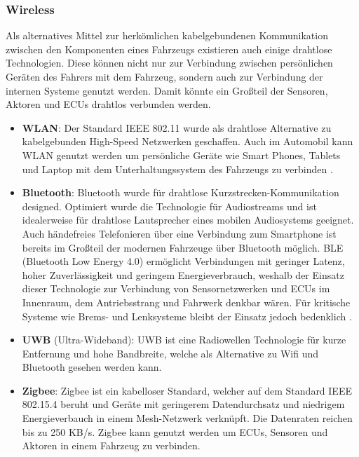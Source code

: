         \subsubsection{Wireless}
        Als alternatives Mittel zur herkömlichen kabelgebundenen Kommunikation zwischen den Komponenten eines Fahrzeugs existieren auch einige drahtlose Technologien.
        Diese können nicht nur zur Verbindung zwischen persönlichen Geräten des Fahrers mit dem Fahrzeug, sondern auch zur Verbindung der internen Systeme genutzt werden.
        Damit könnte ein Großteil der Sensoren, Aktoren und ECUs drahtlos verbunden werden.
            \begin{itemize}
                \item \textbf{WLAN}: Der Standard IEEE 802.11 wurde als drahtlose Alternative zu kabelgebunden High-Speed
                Netzwerken geschaffen. Auch im Automobil kann WLAN genutzt werden um persönliche Geräte wie Smart Phones,
                Tablets und Laptop mit dem Unterhaltungssystem des Fahrzeugs zu verbinden \cite{TW_huang2018vehicle}. 
                \item \textbf{Bluetooth}: Bluetooth wurde für drahtlose Kurzstrecken-Kommunikation designed. Optimiert wurde die
                Technologie für Audiostreams und ist idealerweise für drahtlose Lautsprecher eines mobilen Audiosystems geeignet.
                Auch händefreies Telefonieren über eine Verbindung zum Smartphone ist bereits im Großteil der modernen Fahrzeuge 
                über Bluetooth möglich. BLE (Bluetooth Low Energy 4.0) ermöglicht Verbindungen mit geringer Latenz, hoher Zuverlässigkeit
                und geringem Energieverbrauch, weshalb der Einsatz dieser Technologie zur Verbindung von Sensornetzwerken und ECUs im Innenraum, 
                dem Antriebsstrang und Fahrwerk denkbar wären. Für kritische Systeme wie Brems- und Lenksysteme bleibt der Einsatz jedoch bedenklich \cite{TW_huang2018vehicle}.
                \item \textbf{UWB} (Ultra-Wideband): UWB ist eine Radiowellen Technologie für kurze Entfernung und hohe Bandbreite, welche als Alternative zu Wifi und Bluetooth gesehen werden kann.
                \item \textbf{Zigbee}: Zigbee ist ein kabelloser Standard, welcher auf dem Standard IEEE 802.15.4 beruht und Geräte mit geringerem Datendurchsatz und niedrigem Energieverbauch in einem 
                Mesh-Netzwerk verknüpft. Die Datenraten reichen bis zu 250 KB/s. Zigbee kann genutzt werden um ECUs, Sensoren und Aktoren in einem Fahrzeug zu verbinden.
            \end{itemize}

